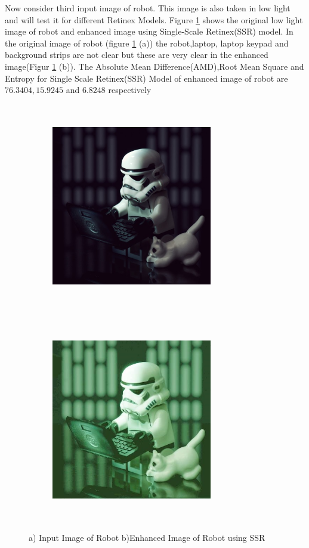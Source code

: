 Now consider third input image of robot. This image is also taken in low light and will test it for different Retinex Models. Figure \ref{fig:ssrRobot} shows the original low light image of robot and enhanced image using Single-Scale Retinex(SSR) model. In the original image of robot (figure \ref{fig:ssrRobot} (a))  the robot,laptop, laptop keypad and background strips are not clear but these are very clear in the enhanced image(Figur \ref{fig:ssrRobot} (b)). The Absolute Mean Difference(AMD),Root Mean Square and Entropy for Single Scale Retinex(SSR) Model of enhanced image of robot are $76.3404, 15.9245$ and $6.8248$ respectively      


\begin{figure}
	\begin{subfigure}{8cm}
		\centering    
    	\includegraphics[width=7cm,height=9cm,keepaspectratio]{images/ch5/robot_input.jpg}
    	\caption{} 
    \end{subfigure}
  	\begin{subfigure}{6cm}
  		\centering
  		\includegraphics[width=7cm,height=9cm,keepaspectratio]{images/ch5/robot_ssr.jpg}
   		\caption{}
  	\end{subfigure}
  	\caption{a) Input Image of Robot b)Enhanced Image of Robot using SSR}
  	\label{fig:ssrRobot}
\end{figure}



